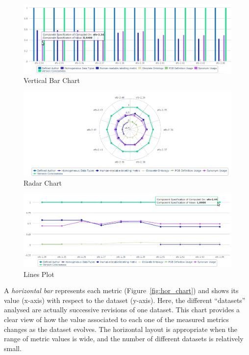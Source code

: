 \begin{figure}[tbph]
\center
\includegraphics[scale=0.3]{images/cube_2.png} 
\caption{Vertical Bar Chart} 
\label{fig:ver_chart}
\end{figure}

\begin{figure}[tbph]
\center
\includegraphics[scale=0.3]{images/cube_3.png} 
\caption{Radar Chart} 
\label{fig:rad_chart}
\end{figure}

\begin{figure}[tbph]
\center
\includegraphics[scale=0.3]{images/cube_4.png} 
\caption{Lines Plot} 
\label{fig:line_chart}
\end{figure}

A \emph{horizontal bar} represents each metric (Figure~\ref{fig:hor_chart}) and shows its value (x-axis) with respect to the dataset (y-axis).
Here, the different “datasets” analysed are actually successive revisions of one dataset.
This chart provides a clear view of how the value associated to each one of the measured metrics changes as the dataset evolves.
The horizontal layout is appropriate when the range of metric values is wide, and the number of different datasets is relatively small.

